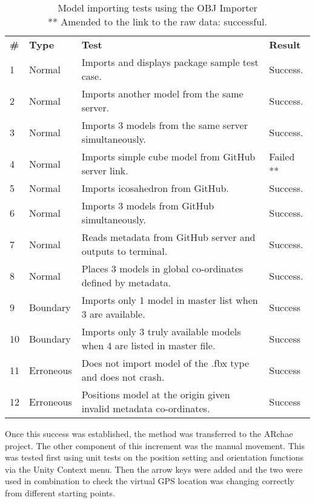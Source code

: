 \documentclass{article}
\begin{document}
\begin{table}[H]
\begin{tabular}{llll}
\textbf{\#} & \textbf{Type} & \textbf{Test}                                               & \textbf{Result} \\
1          & Normal        & Imports and displays package sample test case.              & Success.        \\
2          & Normal        & Imports another model from the same server.                 & Success.        \\
3          & Normal        & Imports 3 models from the same server simultaneously.       & Success.        \\
4  & Normal    & Imports simple cube model from GitHub server link.                      & Failed ** \\
5          & Normal        & Imports icosahedron from GitHub.                            & Success.        \\
6          & Normal        & Imports 3 models from GitHub simultaneously.                & Success.        \\
7          & Normal        & Reads metadata from GitHub server and outputs to terminal.  & Success.        \\
8          & Normal        & Places 3 models in global co-ordinates defined by metadata. & Success.        \\
9          & Boundary      & Imports only 1 model in master list when 3 are available.   & Success         \\
10 & Boundary  & Imports only 3 truly available models when 4 are listed in master file. & Success                                                           \\
11         & Erroneous     & Does not import model of the .fbx type and does not crash.  & Success         \\
12 & Erroneous & Positions model at the origin given invalid metadata co-ordinates.      & Success 
\end{tabular}
\caption{Model importing tests using the OBJ Importer \\ ** Amended to the link to the raw data: successful.}
\end{table}

Once this success was established, the method was transferred to the ARchae project. The other component of this increment was the manual movement. This was tested first using unit tests on the position setting and orientation functions via the Unity Context menu. Then the arrow keys were added and the two were used in combination to check the virtual GPS location was changing correctly from different starting points.
\end{document}
